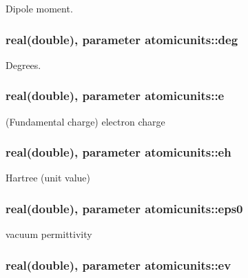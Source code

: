 Dipole moment. 

\hypertarget{classatomicunits_af9552fc54f3050b11cce6152261c2bf2}{
\subsubsection[{deg}]{\setlength{\rightskip}{0pt plus 5cm}real(double), parameter atomicunits\-::deg}}\label{classatomicunits_af9552fc54f3050b11cce6152261c2bf2}


Degrees. 

\hypertarget{classatomicunits_af3650eaf423c8af5e887256a5e8023d6}{
\subsubsection[{e}]{\setlength{\rightskip}{0pt plus 5cm}real(double), parameter atomicunits\-::e}}\label{classatomicunits_af3650eaf423c8af5e887256a5e8023d6}


(Fundamental charge) electron charge 

\hypertarget{classatomicunits_a39b85d20ed96ab0b9dfb86c7646a61a0}{
\subsubsection[{eh}]{\setlength{\rightskip}{0pt plus 5cm}real(double), parameter atomicunits\-::eh}}\label{classatomicunits_a39b85d20ed96ab0b9dfb86c7646a61a0}


Hartree (unit value) 

\hypertarget{classatomicunits_a45821c6127c356d71ba94bf34b962653}{
\subsubsection[{eps0}]{\setlength{\rightskip}{0pt plus 5cm}real(double), parameter atomicunits\-::eps0}}\label{classatomicunits_a45821c6127c356d71ba94bf34b962653}


vacuum permittivity 

\hypertarget{classatomicunits_a10a69964ce0d082d71ee5ae34a5a0d24}{
\subsubsection[{ev}]{\setlength{\rightskip}{0pt plus 5cm}real(double), parameter atomicunits\-::ev}}\label{classatomicunits_a10a69964ce0d082d71ee5ae34a5a0d24}


